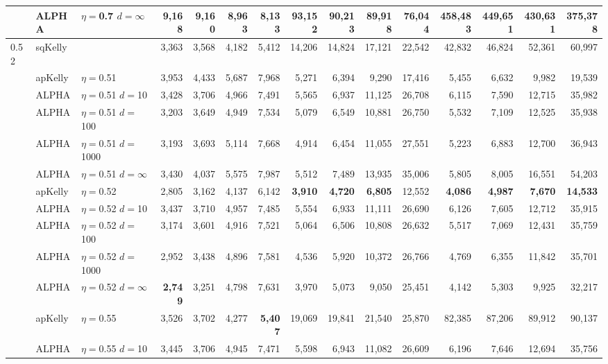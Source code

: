 \documentclass[12pt,runningheads]{llncs}
\begin{document}
{\begin{table}
\begin{tabular}{lll|rrrr|rrrr|rrrr}
 & ALPHA & $\eta=$0.7 $d=\infty$ & 9,168  & 9,160  & 8,963  & 8,133  & 93,152  & 90,213  & 89,918  & 76,044  & 458,483  & 449,651  & 430,631  & 375,378  \\
\hline 0.52 & sqKelly & & 3,363  & 3,568  & 4,182  & 5,412  & 14,206  & 14,824  & 17,121  & 22,542  & 42,832  & 46,824  & 52,361  & 60,997  \\
\cline{2-15} & apKelly & $\eta=$0.51 & 3,953  & 4,433  & 5,687  & 7,968  & 5,271  & 6,394  & 9,290  & 17,416  & 5,455  & 6,632  & 9,982  & 19,539  \\
& ALPHA & $\eta=$0.51 $d=$10 & 3,428  & 3,706  & 4,966  & 7,491  & 5,565  & 6,937  & 11,125  & 26,708  & 6,115  & 7,590  & 12,715  & 35,982  \\
& ALPHA & $\eta=$0.51 $d=$100 & 3,203  & 3,649  & 4,949  & 7,534  & 5,079  & 6,549  & 10,881  & 26,750  & 5,532  & 7,109  & 12,525  & 35,938  \\
& ALPHA & $\eta=$0.51 $d=$1000 & 3,193  & 3,693  & 5,114  & 7,668  & 4,914  & 6,454  & 11,055  & 27,551  & 5,223  & 6,883  & 12,700  & 36,943  \\
 & ALPHA & $\eta=$0.51 $d=\infty$ & 3,430  & 4,037  & 5,575  & 7,987  & 5,512  & 7,489  & 13,935  & 35,006  & 5,805  & 8,005  & 16,551  & 54,203  \\
\cline{2-15} & apKelly & $\eta=$0.52 & 2,805  & 3,162  & 4,137  & 6,142  & \bf{3,910}  & \bf{4,720}  & \bf{6,805}  & 12,552  & \bf{4,086}  & \bf{4,987}  & \bf{7,670}  & \bf{14,533}  \\
& ALPHA & $\eta=$0.52 $d=$10 & 3,437  & 3,710  & 4,957  & 7,485  & 5,554  & 6,933  & 11,111  & 26,690  & 6,126  & 7,605  & 12,712  & 35,915  \\
& ALPHA & $\eta=$0.52 $d=$100 & 3,174  & 3,601  & 4,916  & 7,521  & 5,064  & 6,506  & 10,808  & 26,632  & 5,517  & 7,069  & 12,431  & 35,759  \\
& ALPHA & $\eta=$0.52 $d=$1000 & 2,952  & 3,438  & 4,896  & 7,581  & 4,536  & 5,920  & 10,372  & 26,766  & 4,769  & 6,355  & 11,842  & 35,701  \\
 & ALPHA & $\eta=$0.52 $d=\infty$ & \bf{2,749}  & 3,251  & 4,798  & 7,631  & 3,970  & 5,073  & 9,050  & 25,451  & 4,142  & 5,303  & 9,925  & 32,217  \\
\cline{2-15} & apKelly & $\eta=$0.55 & 3,526  & 3,702  & 4,277  & \bf{5,407}  & 19,069  & 19,841  & 21,540  & 25,870  & 82,385  & 87,206  & 89,912  & 90,137  \\
& ALPHA & $\eta=$0.55 $d=$10 & 3,445  & 3,706  & 4,945  & 7,471  & 5,598  & 6,943  & 11,082  & 26,609  & 6,196  & 7,646  & 12,694  & 35,756  \\

\end{tabular}
\end{table}}
\end{document}
